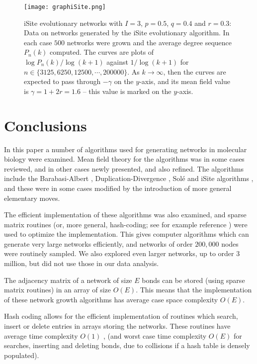 \documentclass[12pt]{iopart}
\begin{document}
\begin{figure}[t!]
 \centering
\texttt{[image: graphiSite.png]}
\caption{{iSite evolutionary networks with $I=3$, $p=0.5$,
$q=0.4$ and $r=0.3$:}  
Data on networks generated by the iSite evolutionary algorithm.  In each case $500$ 
networks were grown and the average degree sequence $P_n(k)$ computed.  The curves 
are plots of $\log P_n(k)/\log (k+1)$ against $1/\log (k+1)$ for $n\in\{3125,6250,12500,\cdots,200000\}$.
As $k\to\infty$, then the curves are expected to pass through $-\gamma$ on the
$y$-axis, and its mean field value is $\gamma = 1+2r=1.6$ -- this value is marked on the
$y$-axis.}
\label{figure6T}
\end{figure}



\section{Conclusions}

In this paper a number of algorithms used for generating networks in molecular biology
were examined.  Mean field theory for the algorithms was in some cases reviewed,
and in other cases newly presented, and also refined.  The algorithms include the
Barabasi-Albert \cite{AB02}, Duplication-Divergence \cite{TR04}, Sol\'e \cite{SPSK02}
and iSite algorithms \cite{G11,GG15}, and these were in
some cases modified by the introduction of more general elementary moves.

The efficient implementation of these algorithms was also examined, and sparse
matrix routines (or, more general, hash-coding; see for example reference \cite{Knuth98})
were used to  optimize the implementation.  This gives computer algorithms which
can generate very large networks efficiently, and networks of order $200,000$ nodes
were routinely sampled.  We also explored even larger networks, up to order 3 million,
but did not use those in our data analysis.  

The adjacency matrix of a network of size $E$ bonds can be stored (using sparse 
matrix routines) in an array of size $O(E)$.  This means that the implementation
of these network growth algorithms has average case space complexity
$O(E)$.

Hash coding allows for the efficient implementation of routines which search,
insert or delete entries in arrays storing the networks.  These routines have
average time complexity $O(1)$ \cite{Cormen09}, (and worst case time complexity
$O(E)$ for searches, inserting and deleting bonds, due to collisions if a hash
table is densely populated).
\end{document}
